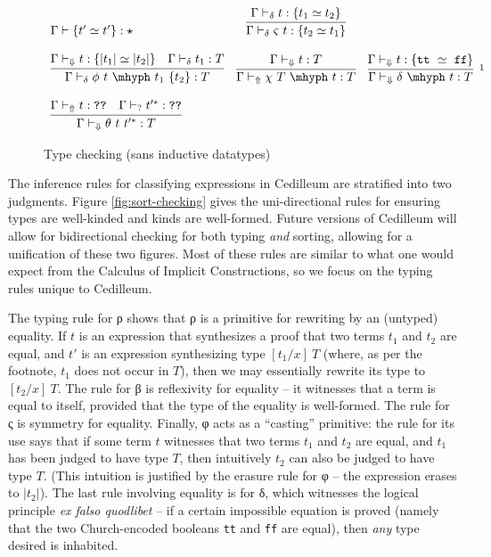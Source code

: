\documentclass{article}
\newcommand{\absu}[3]{{#1}\, #2.\, #3}
\newcommand{\decdir}{\vdash_{\delta}}
\newcommand{\decsyn}{\vdash_{\Uparrow}}
\newcommand{\decchk}{\vdash_{\Downarrow}}
\begin{document}
\begin{figure}[h!]
\[\begin{array}{lcr}
        { \Gamma \vdash \{ t' \simeq t' \} : \star }
      & \infer
        { \Gamma \decdir \varsigma\ t : \{ t_2 \simeq t_1 \} }
        { \Gamma \decdir t : \{ t_1 \simeq t_2 \}}
      \\ \\ \infer
      { \Gamma \decdir \phi\ t\ \mhyph\ t_1\ \{t_2\} : T}
      { \Gamma \decchk t : \{ |t_1| \simeq |t_2| \}
        & \Gamma \decdir t_1 : T}
      & \infer
        { \Gamma \decsyn \chi\ T\ \mhyph\ t : T }
        { \Gamma \decchk t : T }
      & \infer[\footnotemark]
        { \Gamma \decchk \delta\ \mhyph\ t : T }
        { \Gamma \decchk t : \{ \texttt{tt}\ \simeq\ \texttt{ff} \}}
      \\ \\ \infer
      { \Gamma \decchk \theta\ t\ t'^* : T }
      { \Gamma \decsyn t : \texttt{??}
        & \Gamma \vdash_? t'^* : \texttt{??} }
    \end{array}
  \]
  \caption{Type checking \fbox{$\Gamma \decdir s : C$} (sans inductive datatypes)}
  \label{fig:type-checking}
\end{figure}
\footnotetext{Where $\texttt{tt} = \absu{\lambda}{x}{\absu{\lambda}{y}{x}}$ and
  $\texttt{ff} = \absu{\lambda}{x}{\absu{\lambda}{y}{y}}$}

The inference rules for classifying expressions in Cedilleum are stratified into
two judgments. Figure \ref{fig:sort-checking} gives the uni-directional rules
for ensuring types are well-kinded and kinds are well-formed. Future versions of
Cedilleum will allow for bidirectional checking for both typing \textit{and}
sorting, allowing for a unification of these two figures. Most of these rules
are similar to what one would expect from the Calculus of Implicit
Constructions, so we focus on the typing rules unique to Cedilleum.

The typing rule for ρ shows that ρ is a primitive for rewriting by an (untyped)
equality. If $t$ is an expression that synthesizes a proof that two terms $t_1$
and $t_2$ are equal, and $t'$ is an expression synthesizing type $[t_1/x]\ T$
(where, as per the footnote, $t_1$ does not occur in $T$), then we may
essentially rewrite its type to $[t_2/x]\ T$. The rule for β is reflexivity for
equality -- it witnesses that a term is equal to itself, provided that the type
of the equality is well-formed. The rule for ς is symmetry for equality.
Finally, φ acts as a ``casting'' primitive: the rule for its use says that if
some term $t$ witnesses that two terms $t_1$ and $t_2$ are equal, and $t_1$ has
been judged to have type $T$, then intuitively $t_2$ can also be judged to have
type $T$. (This intuition is justified by the erasure rule for φ -- the
expression erases to $|t_2|$). The last rule involving equality is for δ, which
witnesses the logical principle \textit{ex falso quodlibet} -- if a certain
impossible equation is proved (namely that the two Church-encoded booleans
\texttt{tt} and \texttt{ff} are equal), then \textit{any} type desired is
inhabited.
\end{document}

